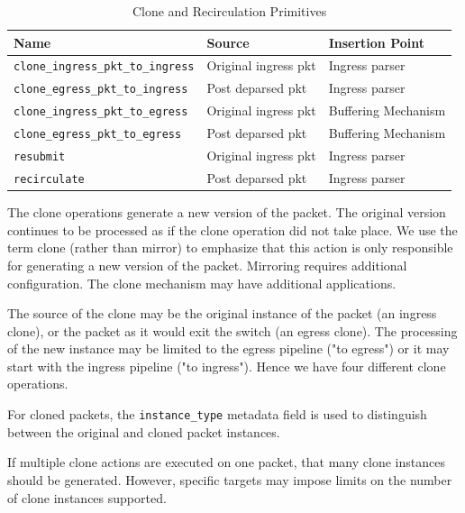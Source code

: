 \documentclass[12pt]{article}
\begin{document}
\begin{table}[H]
\begin{center}
\begin{tabular}{| l | l | l |} \hline
\textbf{Name} &
\textbf{Source} &
\textbf{Insertion Point} \\ \hline
\texttt{clone_ingress_pkt_to_ingress} &
Original ingress pkt &
Ingress parser \\ \hline
\texttt{clone_egress_pkt_to_ingress} &
Post deparsed pkt &
Ingress parser \\ \hline
\texttt{clone_ingress_pkt_to_egress} &
Original ingress pkt &
Buffering Mechanism \\ \hline
\texttt{clone_egress_pkt_to_egress} &
Post deparsed pkt &
Buffering Mechanism \\ \hline
\texttt{resubmit} &
Original ingress pkt &
Ingress parser \\ \hline
\texttt{recirculate} &
Post deparsed pkt &
Ingress parser \\ \hline
\end{tabular}
\end{center}
\caption{Clone and Recirculation Primitives}
\label{tab:clonerecircprimitives}
\end{table}


The clone operations generate a new version of the packet. The original version 
continues to be processed as if the clone operation did not take place. We 
use the term clone (rather than mirror) to emphasize that this action is only 
responsible for generating a new version of the packet. Mirroring requires 
additional configuration. The clone mechanism may have additional applications. 

The source of the clone may be the original instance of the packet (an ingress 
clone), or the packet as it would exit the switch (an egress clone). The processing 
of the new instance may be limited to the egress pipeline ("to egress") or 
it may start with the ingress pipeline ("to ingress").  Hence we have four 
different clone operations.

For cloned packets, the \texttt{instance_type} metadata field is used to distinguish 
between the original and cloned packet instances. 

If multiple clone actions are executed on one packet, that many clone instances 
should be generated.  However, specific targets may impose limits on the number 
of clone instances supported.
\end{document}
